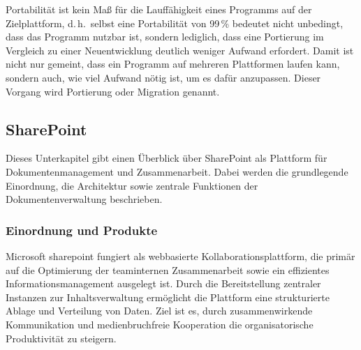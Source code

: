 Portabilität ist kein Maß für die Lauffähigkeit eines Programms auf der
Zielplattform, d.\,h.\ selbst eine Portabilität von 99\,\% bedeutet nicht
unbedingt, dass das Programm nutzbar ist, sondern lediglich, dass eine Portierung im
Vergleich zu einer Neuentwicklung deutlich weniger Aufwand erfordert. Damit ist nicht
nur gemeint, dass ein Programm auf mehreren Plattformen laufen kann, sondern auch,
wie viel Aufwand nötig ist, um es dafür anzupassen.
Dieser Vorgang wird Portierung oder Migration genannt.
\cite{wikipedia2024plattformunabhaengigkeit,boehm1976quality}

\subsection{SharePoint}

Dieses Unterkapitel gibt einen Überblick über SharePoint als Plattform für
Dokumentenmanagement und Zusammenarbeit. Dabei werden die grundlegende Einordnung,
die Architektur sowie zentrale Funktionen der Dokumentenverwaltung beschrieben.

\subsubsection{Einordnung und Produkte}

Microsoft \gls{sharepoint} fungiert als webbasierte Kollaborationsplattform, die primär
auf die Optimierung der teaminternen Zusammenarbeit sowie ein effizientes
Informationsmanagement ausgelegt ist. Durch die Bereitstellung zentraler Instanzen
zur Inhaltsverwaltung ermöglicht die Plattform eine strukturierte Ablage und
Verteilung von Daten. Ziel ist es, durch zusammenwirkende Kommunikation und
medienbruchfreie Kooperation die organisatorische Produktivität zu steigern.
\cite{Microsoft.2024.SharePointSupport,kampffmeyer2006ecm}

